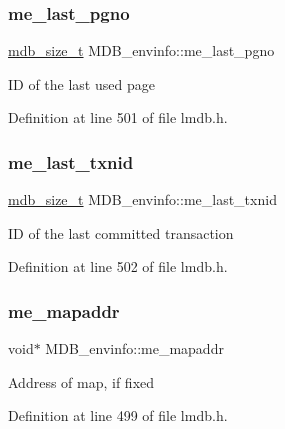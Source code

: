 \subsubsection{\texorpdfstring{me\+\_\+last\+\_\+pgno}{me\_last\_pgno}}
{\footnotesize\ttfamily \mbox{\hyperlink{lmdb_8h_a78821971e612e3898ef4b3ae45ed86f1}{mdb\+\_\+size\+\_\+t}} M\+D\+B\+\_\+envinfo\+::me\+\_\+last\+\_\+pgno}

ID of the last used page 

Definition at line 501 of file lmdb.\+h.

\mbox{\label{struct_m_d_b__envinfo_aad6893e0c0d1219fe29262a7ab1af5eb}} 
\subsubsection{\texorpdfstring{me\+\_\+last\+\_\+txnid}{me\_last\_txnid}}
{\footnotesize\ttfamily \mbox{\hyperlink{lmdb_8h_a78821971e612e3898ef4b3ae45ed86f1}{mdb\+\_\+size\+\_\+t}} M\+D\+B\+\_\+envinfo\+::me\+\_\+last\+\_\+txnid}

ID of the last committed transaction 

Definition at line 502 of file lmdb.\+h.

\mbox{\label{struct_m_d_b__envinfo_aebb8447a3392f888baf6f134fcadaac2}} 
\subsubsection{\texorpdfstring{me\+\_\+mapaddr}{me\_mapaddr}}
{\footnotesize\ttfamily void$\ast$ M\+D\+B\+\_\+envinfo\+::me\+\_\+mapaddr}

Address of map, if fixed 

Definition at line 499 of file lmdb.\+h.

\mbox{\label{struct_m_d_b__envinfo_a0ded63ecbac730090374854e15f30d2e}} 
